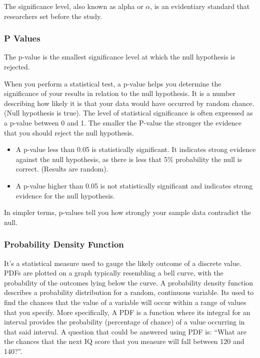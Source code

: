 \documentclass[11pt]{article}
\begin{document}
The significance level, also known as alpha or \(\alpha\), is an
evidentiary standard that researchers set before the study.

\hypertarget{p-values}{%
\subsubsection{P Values}\label{p-values}}

The p-value is the smallest significance level at which the null
hypothesis is rejected.

When you perform a statistical test, a p-value helps you determine the
significance of your results in relation to the null hypothesis. It is a
number describing how likely it is that your data would have occurred by
random chance. (Null hypothesis is true). The level of statistical
significance is often expressed as a p-value between 0 and 1. The
smaller the P-value the stronger the evidence that you should reject the
null hypothesis.

\begin{itemize}
\item
  A p-value less than 0.05 is statistically significant. It indicates
  strong evidence against the null hypothesis, as there is less that 5\%
  probability the null is correct. (Results are random).
\item
  A p-value higher than 0.05 is not statistically significant and
  indicates strong evidence for the null hypothesis.
\end{itemize}

In simpler terms, p-values tell you how strongly your sample data
contradict the null.

\hypertarget{probability-density-function}{%
\subsubsection{Probability Density
Function}\label{probability-density-function}}

It's a statistical measure used to gauge the likely outcome of a
discrete value. PDFs are plotted on a graph typically resembling a bell
curve, with the probability of the outcomes lying below the curve. A
probability density function describes a probability distribution for a
random, continuous variable. Its used to find the chances that the value
of a variable will occur within a range of values that you specify. More
specifically, A PDF is a function where its integral for an interval
provides the probability (percentage of chance) of a value occurring in
that said interval. A question that could be answered using PDF is:
``What are the chances that the next IQ score that you measure will fall
between 120 and 140?''.
\end{document}
